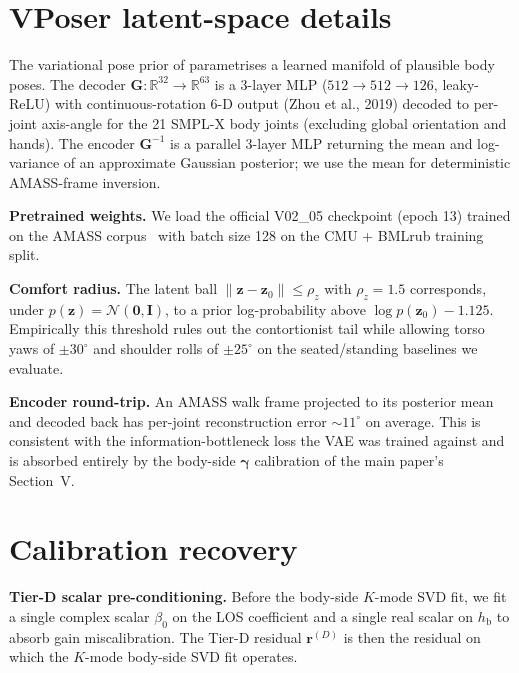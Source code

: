 \documentclass[10pt,journal,twocolumn]{IEEEtran}
\newcommand{\gammab}{\bm{\gamma}}
\newcommand{\hbody}{h_{\mathrm{b}}}
\newcommand{\Reals}{\mathbb{R}}
\theoremstyle{plain}
\theoremstyle{definition}
\begin{document}
\section{VPoser latent-space details}\label{si:vposer}

The variational pose prior of \cite{Pavlakos2019VPoser} parametrises
a learned manifold of plausible body poses. The decoder
$\bm{G}: \Reals^{32} \to \Reals^{63}$ is a 3-layer MLP
($512 \to 512 \to 126$, leaky-ReLU) with continuous-rotation 6-D
output (Zhou et al., 2019) decoded to per-joint axis-angle for the
21 SMPL-X body joints (excluding global orientation and hands).
The encoder $\bm{G}^{-1}$ is a parallel 3-layer MLP returning the
mean and log-variance of an approximate Gaussian posterior; we use
the mean for deterministic AMASS-frame inversion.

\textbf{Pretrained weights.} We load the official V02\_05 checkpoint
(epoch 13) trained on the AMASS corpus~\cite{AMASS2019} with batch
size 128 on the CMU + BMLrub training split.

\textbf{Comfort radius.} The latent ball
$\|\bm{z} - \bm{z}_0\| \leq \rho_z$ with $\rho_z = 1.5$ corresponds,
under $p(\bm{z}) = \mathcal{N}(\bm{0}, \bm{I})$, to a prior
log-probability above $\log p(\bm{z}_0) - 1.125$. Empirically this
threshold rules out the contortionist tail while allowing torso
yaws of $\pm 30^{\circ}$ and shoulder rolls of $\pm 25^{\circ}$ on
the seated/standing baselines we evaluate.

\textbf{Encoder round-trip.} An AMASS walk frame projected to its
posterior mean and decoded back has per-joint reconstruction error
$\sim 11^{\circ}$ on average. This is consistent with the
information-bottleneck loss the VAE was trained against and is
absorbed entirely by the body-side $\gammab$ calibration of the
main paper's Section~V.

\section{Calibration recovery}\label{si:calibration}

\textbf{Tier-D scalar pre-conditioning.} Before the body-side
$K$-mode SVD fit, we fit a single complex scalar $\beta_0$ on the
LOS coefficient and a single real scalar on $\hbody$ to absorb
gain miscalibration. The Tier-D residual $\bm{r}^{(D)}$ is then
the residual on which the $K$-mode body-side SVD fit operates.
\end{document}

